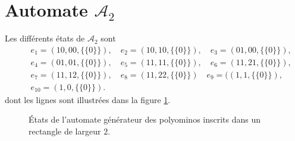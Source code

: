 \section{Automate  $\mathcal{A}_{2}$}
Les différents états de $\mathcal{A}_{2}$ sont
\begin{eqnarray*}
& & e_{1}= (10,00,\{\{0\}\}),\quad e_{2}= (10,10,\{\{0\}\}), \quad e_{3}= (01,00,\{\{0\}\}),\\
& & e_{4}= (01,01,\{\{0\}\}),\quad e_{5}= (11,11,\{\{0\}\}),\quad e_{6}= (11,21,\{\{0\}\}),\\
& & e_{7}= (11,12,\{\{0\}\}),\quad e_{8}= (11,22,\{\{0\}\}) \quad e_{9}=((1,1,\{\{0\}\}),\\
& & e_{10}=(1,0,\{\{0\}\}).
\end{eqnarray*}
dont les lignes sont illustrées  dans  la figure \ref{Atfig2}.
\begin{figure}[!htb]
\begin{minipage}[c]{.16\linewidth}
  \centering
\begin{logicpuzzle}[rows=1,columns=2,color=cyan!100, width=750px,scale=0.5]
\end{logicpuzzle}
\end{minipage}\hfill
\begin{minipage}[c]{.16\linewidth}
  \centering
\begin{logicpuzzle}[rows=1,columns=2,color=cyan!100, width=750px,scale=0.5]
\end{logicpuzzle}
\end{minipage}\hfill
\begin{minipage}[c]{.16\linewidth}
  \centering
\begin{logicpuzzle}[rows=1,columns=2,color=cyan!100, width=750px,scale=0.5]
\end{logicpuzzle}
\end{minipage}\hfill
\begin{minipage}[c]{.16\linewidth}
  \centering
\begin{logicpuzzle}[rows=1,columns=1,color=cyan!100, width=750px,scale=0.5]
\end{logicpuzzle}
\end{minipage}\hfill
\caption{\label{Atfig2} États de l'automate générateur des polyominos inscrits dans un rectangle de largeur $2$.}
\end{figure}
 
